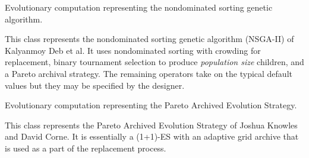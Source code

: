 \documentclass[letterpaper,10pt,english]{sphinxmanual}
\begin{document}
\begin{fulllineitems}
\label{reference:inspyred.ec.emo.NSGA2}
Evolutionary computation representing the nondominated sorting genetic algorithm.

This class represents the nondominated sorting genetic algorithm (NSGA-II)
of Kalyanmoy Deb et al. It uses nondominated sorting with crowding for 
replacement, binary tournament selection to produce \emph{population size}
children, and a Pareto archival strategy. The remaining operators take 
on the typical default values but they may be specified by the designer.

\end{fulllineitems}


\begin{fulllineitems}
\label{reference:inspyred.ec.emo.PAES}
Evolutionary computation representing the Pareto Archived Evolution Strategy.

This class represents the Pareto Archived Evolution Strategy of Joshua
Knowles and David Corne. It is essentially a (1+1)-ES with an adaptive
grid archive that is used as a part of the replacement process.

\end{fulllineitems}

\end{document}
